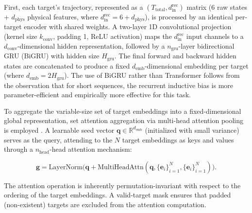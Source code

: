 \documentclass[a4paper,fleqn]{cas-dc}
\begin{document}
First, each target's trajectory, represented as a $(T_{\text{total}}, d_{\text{in}}^{\text{rec}})$ matrix ($6$ raw states $+$ $d_{\text{phys}}$ physical features, where $d_{\text{in}}^{\text{rec}} = 6 + d_{\text{phys}}$), is processed by an identical per-target encoder with shared weights. A two-layer 1D convolutional projection (kernel size $k_{\text{conv}}$, padding 1, ReLU activation) maps the $d_{\text{in}}^{\text{rec}}$ input channels to a $d_{\text{conv}}$-dimensional hidden representation, followed by a $n_{\text{gru}}$-layer bidirectional GRU (BiGRU) \cite{chung2014empirical} with hidden size $H_{\text{gru}}$. The final forward and backward hidden states are concatenated to produce a fixed $d_{\text{emb}}$-dimensional embedding per target (where $d_{\text{emb}} = 2 H_{\text{gru}}$). The use of BiGRU rather than Transformer follows from the observation that for short sequences, the recurrent inductive bias is more parameter-efficient and empirically more effective for this task.

To aggregate the variable-size set of target embeddings into a fixed-dimensional global representation, set attention aggregation via multi-head attention pooling is employed \cite{lee2019set}. A learnable seed vector $\bm{q} \in \mathbb{R}^{d_{\text{emb}}}$ (initialized with small variance) serves as the query, attending to the $N$ target embeddings as keys and values through a $n_{\text{head}}$-head attention mechanism:

\begin{equation}
    \bm{g} = \text{LayerNorm}\bigl(\bm{q} + \text{MultiHeadAttn}(\bm{q}, \{\bm{e}_i\}_{i=1}^{N}, \{\bm{e}_i\}_{i=1}^{N})\bigr).
\end{equation}

The attention operation is inherently permutation-invariant with respect to the ordering of the target embeddings. A valid-target mask ensures that padded (non-existent) targets are excluded from the attention computation.
\end{document}
